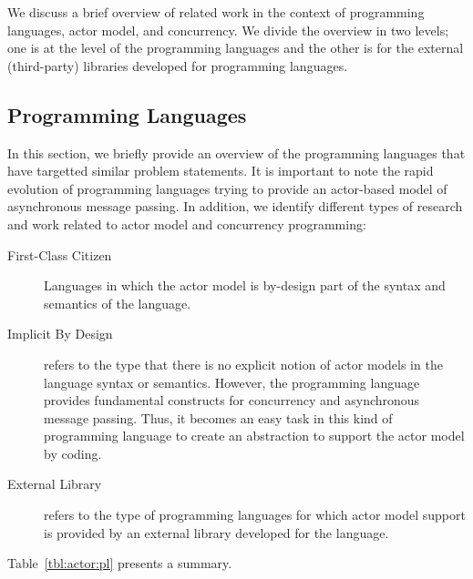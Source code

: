 We discuss a brief overview of related work in the context of programming languages, actor model, and concurrency.
We divide the overview in two levels; one is at the level of the programming languages and the other is for the external (third-party) libraries developed for programming languages.

\subsection{Programming Languages}
\label{sec:intro:proglangs}

In this section, we briefly provide an overview of the programming languages that have targetted similar problem statements.
It is important to note the rapid evolution of programming languages trying to provide an actor-based model of asynchronous message passing.
In addition, we identify different types of research and work related to actor model and concurrency programming:
\begin{description}
\item[First-Class Citizen]
Languages in which the actor model is by-design part of the syntax and semantics of the language.
\item[Implicit By Design]
refers to the type that there is no explicit notion of actor models in the language syntax or semantics.
However, the programming language provides fundamental constructs for concurrency and asynchronous message passing.
Thus, it becomes an easy task in this kind of programming language to create an abstraction to support the actor model by coding.
\item[External Library]
refers to the type of programming languages for which actor model support is provided by an external library developed for the language.
\end{description}


Table~\ref{tbl:actor:pl} presents a summary.

